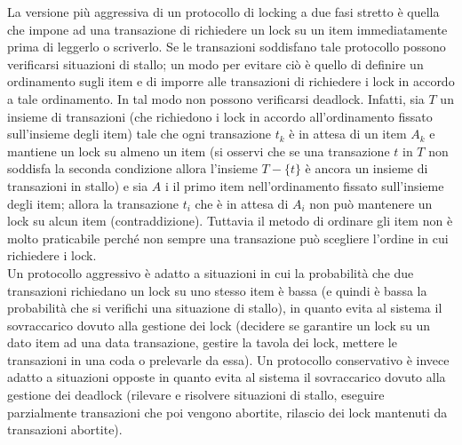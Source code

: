 La versione più aggressiva di un protocollo di locking a due fasi stretto è quella che impone ad una
transazione di richiedere un lock su un item immediatamente prima di leggerlo o scriverlo. Se le
transazioni soddisfano tale protocollo possono verificarsi situazioni di stallo; un modo per evitare
ciò è quello di definire un ordinamento sugli item e di imporre alle transazioni di richiedere i lock in
accordo a tale ordinamento. In tal modo non possono verificarsi deadlock. Infatti, sia $T$ un insieme
di transazioni (che richiedono i lock in accordo all'ordinamento fissato sull'insieme degli item) tale
che ogni transazione $t_k$ è in attesa di un item $A_k$ e mantiene un lock su almeno un item (si osservi
che se una transazione $t$ in $T$ non soddisfa la seconda condizione allora l'insieme $T-\{t\}$ è ancora
un insieme di transazioni in stallo) e sia $A$ i il primo item nell'ordinamento fissato sull'insieme degli
item; allora la transazione $t_i$ che è in attesa di $A_i$ non può mantenere un lock su alcun item
(contraddizione). Tuttavia il metodo di ordinare gli item non è molto praticabile perché non sempre
una transazione può scegliere l'ordine in cui richiedere i lock.\\
Un protocollo aggressivo è adatto a situazioni in cui la probabilità che due transazioni richiedano un
lock su uno stesso item è bassa (e quindi è bassa la probabilità che si verifichi una situazione di
stallo), in quanto evita al sistema il sovraccarico dovuto alla gestione dei lock (decidere se garantire
un lock su un dato item ad una data transazione, gestire la tavola dei lock, mettere le transazioni in
una coda o prelevarle da essa). Un protocollo conservativo è invece adatto a situazioni opposte in
quanto evita al sistema il sovraccarico dovuto alla gestione dei deadlock (rilevare e risolvere
situazioni di stallo, eseguire parzialmente transazioni che poi vengono abortite, rilascio dei lock
mantenuti da transazioni abortite).

